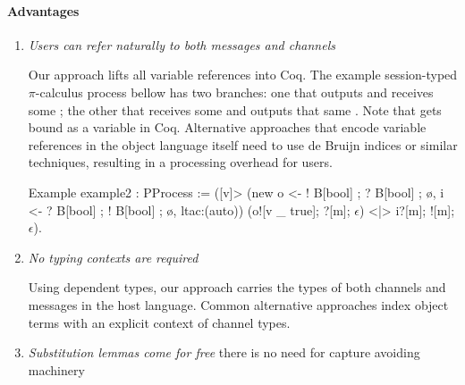 \documentclass{mproj}
\newcommand{\picalc}{$\pi$-calculus}
\begin{document}
\paragraph{Advantages}
\begin{enumerate}
    \item \emph{Users can refer naturally to both messages and channels}

    Our approach lifts all variable references into Coq. The example session-typed \picalc{} process bellow has two branches: one that outputs  and receives some ; the other that receives some  and outputs that same . Note that  gets bound as a variable in Coq. Alternative approaches that encode variable references in the object language itself need to use de Bruijn indices \cite{deBruijn1972} or similar techniques, resulting in a processing overhead for users.
        
    \begin{coq}
    Example example2 : PProcess := ([v]>
        (new o <- ! B[bool] ; ? B[bool] ; ø,
             i <- ? B[bool] ; ! B[bool] ; ø,
             ltac:(auto))
        (o![v _ true]; ?[m]; $\epsilon$) <|> i?[m]; ![m]; $\epsilon$).
    \end{coq}

    \item \emph{No typing contexts are required}

    Using dependent types, our approach carries the types of both channels and messages in the host language. Common alternative approaches index object terms with an explicit context of channel types.

    \item \emph{Substitution lemmas come for free}
        there is no need for capture avoiding machinery
        \cite{Felty2010}


\end{enumerate}
\end{document}
